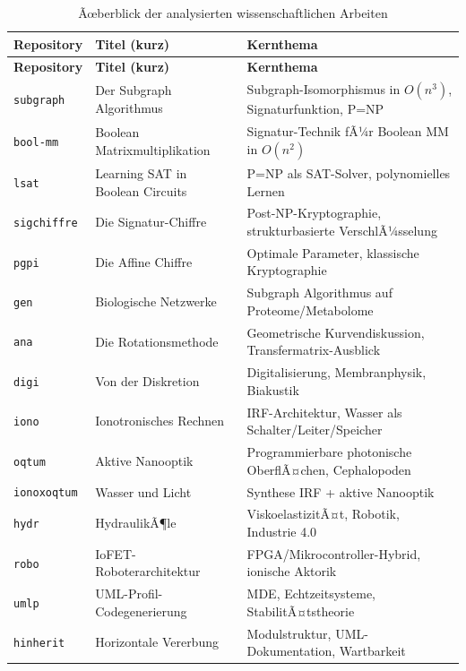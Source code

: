 ﻿\documentclass[a4paper,12pt]{scrreprt}
\theoremstyle{definition}
\begin{document}
\begin{longtable}{p{2.8cm} p{5.5cm} p{5.5cm}}
\caption{Ãœberblick der analysierten wissenschaftlichen Arbeiten}
\label{tab:repos}\\
\toprule
\textbf{Repository} & \textbf{Titel (kurz)} & \textbf{Kernthema} \\
\midrule
\endfirsthead
\toprule
\textbf{Repository} & \textbf{Titel (kurz)} & \textbf{Kernthema} \\
\midrule
\endhead
\bottomrule
\endfoot
\texttt{subgraph} & Der Subgraph Algorithmus & Subgraph-Isomorphismus in $O(n^3)$, Signaturfunktion, P=NP \\[4pt]
\texttt{bool-mm}  & Boolean Matrixmultiplikation & Signatur-Technik fÃ¼r Boolean MM in $O(n^2)$ \\[4pt]
\texttt{lsat}     & Learning SAT in Boolean Circuits & P=NP als SAT-Solver, polynomielles Lernen \\[4pt]
\texttt{sigchiffre} & Die Signatur-Chiffre & Post-NP-Kryptographie, strukturbasierte VerschlÃ¼sselung \\[4pt]
\texttt{pgpi}     & Die Affine Chiffre & Optimale Parameter, klassische Kryptographie \\[4pt]
\texttt{gen}      & Biologische Netzwerke & Subgraph Algorithmus auf Proteome/Metabolome \\[4pt]
\texttt{ana}      & Die Rotationsmethode & Geometrische Kurvendiskussion, Transfermatrix-Ausblick \\[4pt]
\texttt{digi}     & Von der Diskretion & Digitalisierung, Membranphysik, Biakustik \\[4pt]
\texttt{iono}     & Ionotronisches Rechnen & IRF-Architektur, Wasser als Schalter/Leiter/Speicher \\[4pt]
\texttt{oqtum}    & Aktive Nanooptik & Programmierbare photonische OberflÃ¤chen, Cephalopoden \\[4pt]
\texttt{ionoxoqtum} & Wasser und Licht & Synthese IRF + aktive Nanooptik \\[4pt]
\texttt{hydr}     & HydraulikÃ¶le & ViskoelastizitÃ¤t, Robotik, Industrie 4.0 \\[4pt]
\texttt{robo}     & IoFET-Roboterarchitektur & FPGA/Mikrocontroller-Hybrid, ionische Aktorik \\[4pt]
\texttt{umlp}     & UML-Profil-Codegenerierung & MDE, Echtzeitsysteme, StabilitÃ¤tstheorie \\[4pt]
\texttt{hinherit} & Horizontale Vererbung & Modulstruktur, UML-Dokumentation, Wartbarkeit \\
\end{longtable}
\end{document}
